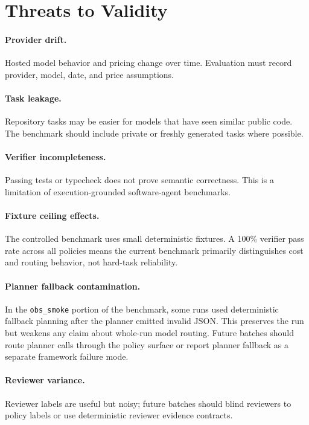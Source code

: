 \documentclass[11pt]{article}
\begin{document}
\section{Threats to Validity}

\paragraph{Provider drift.}
Hosted model behavior and pricing change over time. Evaluation must record
provider, model, date, and price assumptions.

\paragraph{Task leakage.}
Repository tasks may be easier for models that have seen similar public code.
The benchmark should include private or freshly generated tasks where possible.

\paragraph{Verifier incompleteness.}
Passing tests or typecheck does not prove semantic correctness. This is a
limitation of execution-grounded software-agent benchmarks.

\paragraph{Fixture ceiling effects.}
The controlled benchmark uses small deterministic fixtures. A 100\% verifier
pass rate across all policies means the current benchmark primarily
distinguishes cost and routing behavior, not hard-task reliability.

\paragraph{Planner fallback contamination.}
In the \texttt{obs\_smoke} portion of the benchmark, some runs used
deterministic fallback planning after the planner emitted invalid JSON. This
preserves the run but weakens any claim about whole-run model routing. Future
batches should route planner calls through the policy surface or report planner
fallback as a separate framework failure mode.

\paragraph{Reviewer variance.}
Reviewer labels are useful but noisy; future batches should blind reviewers to
policy labels or use deterministic reviewer evidence contracts.
\end{document}
